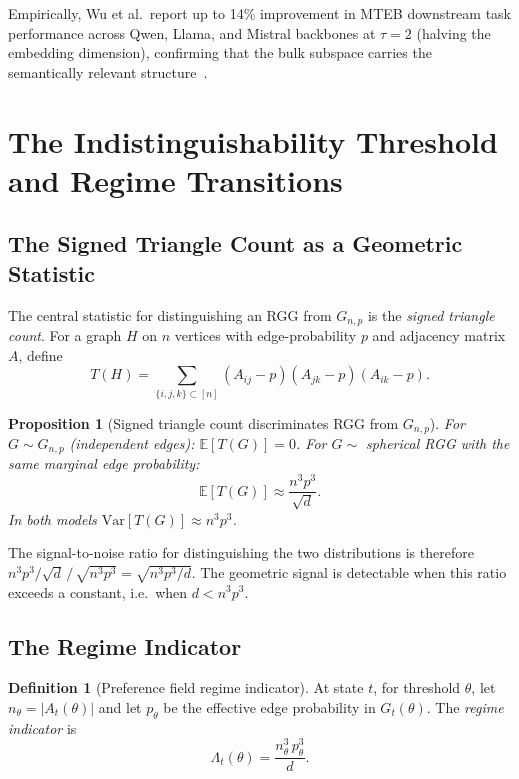 \documentclass[12pt, a4paper]{article}
\theoremstyle{plain}
\newtheorem{proposition}{Proposition}[section]
\theoremstyle{definition}
\newtheorem{definition}{Definition}[section]
\begin{document}
Empirically, Wu et al.\ report up to 14\% improvement in MTEB downstream
task performance across Qwen, Llama, and Mistral backbones at $\tau = 2$
(halving the embedding dimension), confirming that the bulk subspace carries
the semantically relevant structure~\cite{wu2026embedfilter}.

\section{The Indistinguishability Threshold and Regime Transitions}
\label{sec:threshold}

\subsection{The Signed Triangle Count as a Geometric Statistic}

The central statistic for distinguishing an RGG from $G_{n,p}$ is the
\textit{signed triangle count}. For a graph $H$ on $n$ vertices with
edge-probability $p$ and adjacency matrix $A$, define
\begin{equation}
  T(H) = \sum_{\{i,j,k\} \subset [n]}
  (A_{ij} - p)(A_{jk} - p)(A_{ik} - p).
\end{equation}

\begin{proposition}[Signed triangle count discriminates RGG from $G_{n,p}$]
\label{prop:triangle}
For $G \sim G_{n,p}$ (independent edges): $\mathbb{E}[T(G)] = 0$.
For $G \sim$ spherical RGG with the same marginal edge probability:
\begin{equation}
  \mathbb{E}[T(G)] \approx \frac{n^3 p^3}{\sqrt{d}}.
\end{equation}
In both models $\mathrm{Var}[T(G)] \approx n^3 p^3$.
\end{proposition}

The signal-to-noise ratio for distinguishing the two distributions is
therefore $n^3 p^3 / \sqrt{d} \,/\, \sqrt{n^3 p^3} = \sqrt{n^3 p^3 / d}$.
The geometric signal is detectable when this ratio exceeds a constant, i.e.\
when $d < n^3 p^3$.

\subsection{The Regime Indicator}

\begin{definition}[Preference field regime indicator]
At state $t$, for threshold $\theta$, let $n_\theta = |A_t(\theta)|$ and
let $p_\theta$ be the effective edge probability in $G_t(\theta)$. The
\emph{regime indicator} is
\begin{equation}
  \label{eq:lambda}
  \Lambda_t(\theta) = \frac{n_\theta^3\, p_\theta^3}{d}.
\end{equation}
\end{definition}
\end{document}
